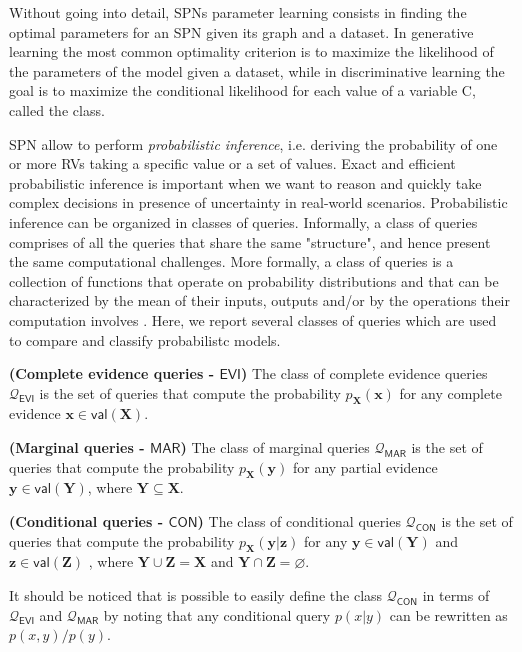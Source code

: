 Without going into detail, SPNs parameter learning consists in finding the optimal parameters for an SPN given its graph and a dataset. In generative learning the most common optimality criterion is to maximize the likelihood of the parameters of the model given a dataset, while in discriminative learning the goal is to maximize the conditional likelihood for each value of a variable C, called the class.

SPN allow to perform \textit{probabilistic inference}, i.e. deriving the probability of one or more RVs taking a specific value or a set of values. Exact and efficient probabilistic inference is important when we want to reason and quickly take complex decisions in presence of uncertainty in real-world scenarios. Probabilistic inference can be organized in classes of queries. Informally, a class of queries comprises of all the queries that share the same "structure", and hence present the same computational challenges. More formally, a class of queries is a collection of functions that operate on probability distributions and that can be characterized by the mean of their inputs, outputs and/or by the operations their computation involves \cite{ProbCirc20}. Here, we report several classes of queries which are used to compare and classify probabilistc models. 

\begin{definition}{\textbf{(Complete evidence queries - $\mathsf{EVI}$)}}
\label{def:evi}
The class of complete evidence queries $\boldsymbol{\mathcal{Q}}_{\mathsf{EVI}}$ is the set of queries that compute the probability $p_{\mathbf{X}}(\mathbf{x})$ for any complete evidence $\mathbf{x} \in \mathsf{val}(\mathbf{X})$.
\end{definition}

\begin{definition}{\textbf{(Marginal queries - $\mathsf{MAR}$)}}
\label{def:mar}
The class of marginal queries $\boldsymbol{\mathcal{Q}}_{\mathsf{MAR}}$ is the set of queries that compute the probability $p_{\mathbf{X}}(\mathbf{y})$ for any partial evidence $\mathbf{y} \in \mathsf{val}(\mathbf{Y})$, where $\mathbf{Y} \subseteq \mathbf{X}$.
\end{definition}

\begin{definition}{\textbf{(Conditional queries - $\mathsf{CON}$)}}
\label{def:con}
The class of conditional queries $\boldsymbol{\mathcal{Q}}_{\mathsf{CON}}$ is the set of queries that compute the probability $p_{\mathbf{X}}(\mathbf{y} | \mathbf{z})$ for any $\mathbf{y} \in \mathsf{val}(\mathbf{Y})$ and $\mathbf{z} \in \mathsf{val}(\mathbf{Z})$ , where $\mathbf{Y} \cup \mathbf{Z} = \mathbf{X}$ and $\mathbf{Y} \cap \mathbf{Z} = \varnothing$.
\end{definition}
It should be noticed that is possible to easily define the class $\boldsymbol{\mathcal{Q}}_{\mathsf{CON}}$ in terms of $\boldsymbol{\mathcal{Q}}_{\mathsf{EVI}}$ and $\boldsymbol{\mathcal{Q}}_{\mathsf{MAR}}$ by noting that any conditional query $p(x|y)$ can be rewritten as $p(x,y) / p(y)$.


